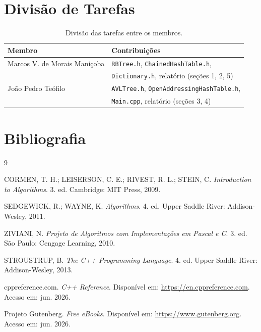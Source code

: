 \documentclass[12pt, a4paper]{article}
\begin{document}
\section{Divisão de Tarefas}

\begin{table}[H]
\centering
\caption{Divisão das tarefas entre os membros.}
\begin{tabular}{ll}
\toprule
\textbf{Membro} & \textbf{Contribuições} \\
\midrule
Marcos V. de Morais Maniçoba
    & \texttt{RBTree.h}, \texttt{ChainedHashTable.h}, \\
    & \texttt{Dictionary.h}, relatório (seções 1, 2, 5) \\[0.3cm]
João Pedro Teófilo
    & \texttt{AVLTree.h}, \texttt{OpenAddressingHashTable.h}, \\
    & \texttt{Main.cpp}, relatório (seções 3, 4) \\
\bottomrule
\end{tabular}
\end{table}

\section{Bibliografia}

\begin{thebibliography}{9}

CORMEN, T. H.; LEISERSON, C. E.; RIVEST, R. L.; STEIN, C.
\textit{Introduction to Algorithms}. 3. ed.
Cambridge: MIT Press, 2009.

SEDGEWICK, R.; WAYNE, K.
\textit{Algorithms}. 4. ed.
Upper Saddle River: Addison-Wesley, 2011.

ZIVIANI, N.
\textit{Projeto de Algoritmos com Implementações em Pascal e C}. 3. ed.
São Paulo: Cengage Learning, 2010.

STROUSTRUP, B.
\textit{The C++ Programming Language}. 4. ed.
Upper Saddle River: Addison-Wesley, 2013.

cppreference.com.
\textit{C++ Reference}.
Disponível em: \url{https://en.cppreference.com}.
Acesso em: jun. 2026.

Projeto Gutenberg.
\textit{Free eBooks}.
Disponível em: \url{https://www.gutenberg.org}.
Acesso em: jun. 2026.

\end{thebibliography}
\end{document}
